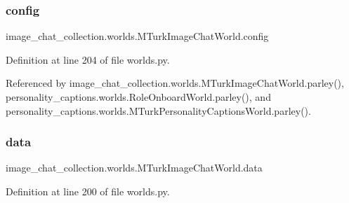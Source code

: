 \subsubsection{\texorpdfstring{config}{config}}
{\footnotesize\ttfamily image\+\_\+chat\+\_\+collection.\+worlds.\+M\+Turk\+Image\+Chat\+World.\+config}



Definition at line 204 of file worlds.\+py.



Referenced by image\+\_\+chat\+\_\+collection.\+worlds.\+M\+Turk\+Image\+Chat\+World.\+parley(), personality\+\_\+captions.\+worlds.\+Role\+Onboard\+World.\+parley(), and personality\+\_\+captions.\+worlds.\+M\+Turk\+Personality\+Captions\+World.\+parley().

\mbox{\label{classimage__chat__collection_1_1worlds_1_1MTurkImageChatWorld_ac03c068df619250dd205eee8ecab59e3}} 
\subsubsection{\texorpdfstring{data}{data}}
{\footnotesize\ttfamily image\+\_\+chat\+\_\+collection.\+worlds.\+M\+Turk\+Image\+Chat\+World.\+data}



Definition at line 200 of file worlds.\+py.



